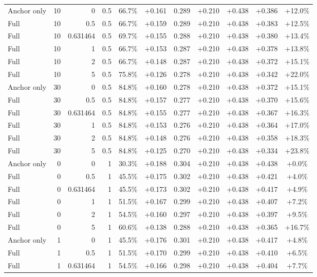 \begin{table}[htbp]
\begin{tabular}{lrrrccccccc}
Anchor only & 10 & 0 & 0.5 & 66.7\% & +0.161 & 0.289 & +0.210 & +0.438 & +0.386 & +12.0\% \\
Full & 10 & 0.5 & 0.5 & 66.7\% & +0.159 & 0.289 & +0.210 & +0.438 & +0.383 & +12.5\% \\
Full & 10 & 0.631464 & 0.5 & 69.7\% & +0.155 & 0.288 & +0.210 & +0.438 & +0.380 & +13.4\% \\
Full & 10 & 1 & 0.5 & 66.7\% & +0.153 & 0.287 & +0.210 & +0.438 & +0.378 & +13.8\% \\
Full & 10 & 2 & 0.5 & 66.7\% & +0.148 & 0.287 & +0.210 & +0.438 & +0.372 & +15.1\% \\
Full & 10 & 5 & 0.5 & 75.8\% & +0.126 & 0.278 & +0.210 & +0.438 & +0.342 & +22.0\% \\
Anchor only & 30 & 0 & 0.5 & 84.8\% & +0.160 & 0.278 & +0.210 & +0.438 & +0.372 & +15.1\% \\
Full & 30 & 0.5 & 0.5 & 84.8\% & +0.157 & 0.277 & +0.210 & +0.438 & +0.370 & +15.6\% \\
Full & 30 & 0.631464 & 0.5 & 84.8\% & +0.155 & 0.277 & +0.210 & +0.438 & +0.367 & +16.3\% \\
Full & 30 & 1 & 0.5 & 84.8\% & +0.153 & 0.276 & +0.210 & +0.438 & +0.364 & +17.0\% \\
Full & 30 & 2 & 0.5 & 84.8\% & +0.148 & 0.276 & +0.210 & +0.438 & +0.358 & +18.3\% \\
Full & 30 & 5 & 0.5 & 84.8\% & +0.125 & 0.270 & +0.210 & +0.438 & +0.334 & +23.8\% \\
Anchor only & 0 & 0 & 1 & 30.3\% & +0.188 & 0.304 & +0.210 & +0.438 & +0.438 & +0.0\% \\
Full & 0 & 0.5 & 1 & 45.5\% & +0.175 & 0.302 & +0.210 & +0.438 & +0.421 & +4.0\% \\
Full & 0 & 0.631464 & 1 & 45.5\% & +0.173 & 0.302 & +0.210 & +0.438 & +0.417 & +4.9\% \\
Full & 0 & 1 & 1 & 51.5\% & +0.167 & 0.299 & +0.210 & +0.438 & +0.407 & +7.2\% \\
Full & 0 & 2 & 1 & 54.5\% & +0.160 & 0.297 & +0.210 & +0.438 & +0.397 & +9.5\% \\
Full & 0 & 5 & 1 & 60.6\% & +0.138 & 0.288 & +0.210 & +0.438 & +0.365 & +16.7\% \\
Anchor only & 1 & 0 & 1 & 45.5\% & +0.176 & 0.301 & +0.210 & +0.438 & +0.417 & +4.8\% \\
Full & 1 & 0.5 & 1 & 51.5\% & +0.170 & 0.299 & +0.210 & +0.438 & +0.410 & +6.5\% \\
Full & 1 & 0.631464 & 1 & 54.5\% & +0.166 & 0.298 & +0.210 & +0.438 & +0.404 & +7.7\% \\

\end{tabular}
\end{table}
